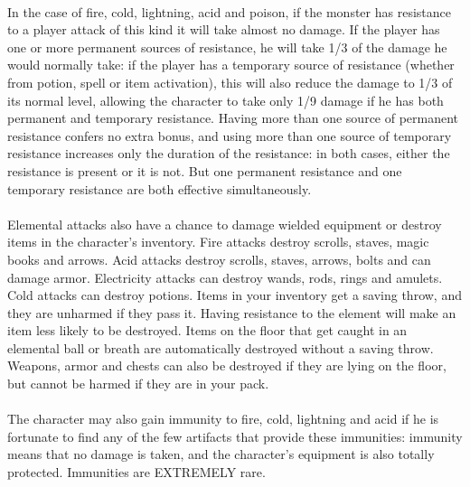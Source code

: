 \paragraph{}
In the case of fire, cold, lightning, acid and poison, if the monster
has resistance to a player attack of this kind it will take almost no
damage. If the player has one or more permanent sources of resistance,
he will take 1/3 of the damage he would normally take: if the player has
a temporary source of resistance (whether from potion, spell or item
activation), this will also reduce the damage to 1/3 of its normal
level, allowing the character to take only 1/9 damage if he has both
permanent and temporary resistance. Having more than one source of
permanent resistance confers no extra bonus, and using more than one
source of temporary resistance increases only the duration of the
resistance: in both cases, either the resistance is present or it is
not. But one permanent resistance and one temporary resistance are both
effective simultaneously.

\paragraph{}
Elemental attacks also have a chance to damage wielded equipment or
destroy items in the character's inventory. Fire attacks destroy
scrolls, staves, magic books and arrows. Acid attacks destroy scrolls,
staves, arrows, bolts and can damage armor. Electricity attacks can
destroy wands, rods, rings and amulets. Cold attacks can destroy
potions. Items in your inventory get a saving throw, and they are
unharmed if they pass it. Having resistance to the element will make an
item less likely to be destroyed. Items on the floor that get caught in
an elemental ball or breath are automatically destroyed without a saving
throw. Weapons, armor and chests can also be destroyed if they are
lying on the floor, but cannot be harmed if they are in your pack.

\paragraph{}
The character may also gain immunity to fire, cold, lightning and acid if
he is fortunate to find any of the few artifacts that provide these
immunities: immunity means that no damage is taken, and the character's
equipment is also totally protected. Immunities are EXTREMELY rare.

